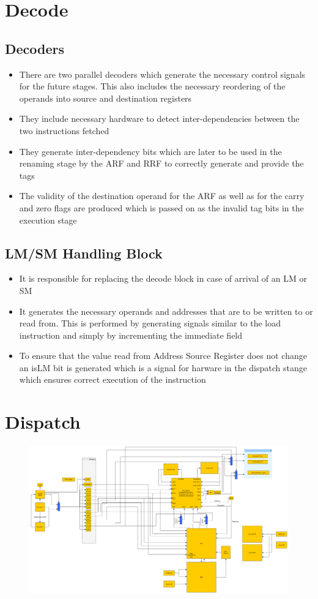 \documentclass{article}
\begin{document}
\section{Decode}
\subsection{Decoders}
\begin{itemize}
\item There are two parallel decoders which generate the necessary control signals for the future stages. This also includes the necessary reordering of the operands into source and destination registers
\item They include necessary hardware to detect inter-dependencies between the two instructions fetched
\item They generate inter-dependency bits which are later to be used in the renaming stage by the ARF and RRF to correctly generate and provide the tags
\item The validity of the destination operand for the ARF as well as for the carry and zero flags are produced which is passed on as the invalid tag bits in the execution stage
\end{itemize}
\subsection{LM/SM Handling Block}
\begin{itemize}
\item It is responsible for replacing the decode block in case of arrival of an LM or SM
\item It generates the necessary operands and addresses that are to be written to or read from. This is performed by generating signals similar to the load instruction and simply by incrementing the immediate field
\item To ensure that the value read from Address Source Register does not change an isLM bit is generated which is a signal for harware in the dispatch stange which ensures correct execution of the instruction
\end{itemize}

\section{Dispatch}
\begin{figure}[H]
	\centering
	\includegraphics[scale = 0.2]{../GraphImages/dispatch_stage_arf_rrf.png}
\end{figure}
\end{document}
